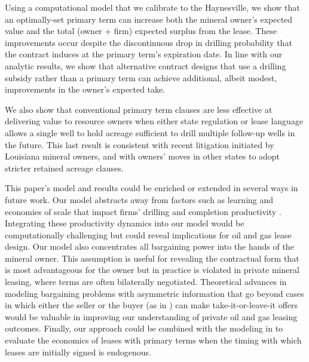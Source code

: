 \documentclass[12pt]{article}
\begin{document}
Using a computational model that we calibrate to the Haynesville, we show that an optimally-set primary term can increase both the mineral owner's expected value and the total (owner + firm) expected surplus from the lease. These improvements occur despite the discontinuous drop in drilling probability that the contract induces at the primary term's expiration date. In line with our analytic results, we show that alternative contract designs that use a drilling subsidy rather than a primary term can achieve additional, albeit modest, improvements in the owner's expected take. 

We also show that conventional primary term clauses are less effective at delivering value to resource owners when either state regulation or lease language allows a single well to hold acreage sufficient to drill multiple follow-up wells in the future. This last result is consistent with recent litigation initiated by Louisiana mineral owners, and with owners' moves in other states to adopt stricter retained acreage clauses.

This paper's model and results could be enriched or extended in several ways in future work. Our model abstracts away from factors such as learning and economies of scale that impact firms' drilling and completion productivity \citep{bib:covert,bib:agerton,bib:fetter_etal,bib:hodgson,bib:steck}. Integrating these productivity dynamics into our model would be computationally challenging but could reveal implications for oil and gas lease design. Our model also concentrates all bargaining power into the hands of the mineral owner. This assumption is useful for revealing the contractual form that is most advantageous for the owner but in practice is violated in private mineral leasing, where terms are often bilaterally negotiated. Theoretical advances in modeling bargaining problems with asymmetric information that go beyond cases in which either the seller or the buyer (as in \cite{bib:demarzo}) can make take-it-or-leave-it offers would be valuable in improving our understanding of private oil and gas leasing outcomes. Finally, our approach could be combined with the modeling in \citet{bib:cong} to evaluate the economics of leases with primary terms when the timing with which leases are initially signed is endogenous.
\end{document}
